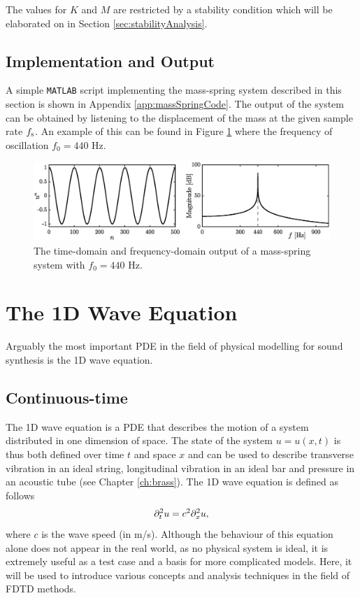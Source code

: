 The values for $K$ and $M$ are restricted by a stability condition which will be elaborated on in Section \ref{sec:stabilityAnalysis}.

\subsection{Implementation and Output}
A simple \texttt{MATLAB} script implementing the mass-spring system described in this section is shown in Appendix \ref{app:massSpringCode}. The output of the system can be obtained by listening to the displacement of the mass at the given sample rate $f_\text{s}$. An example of this can be found in Figure \ref{fig:massSpringOutput} where the frequency of oscillation $f_0 = 440$ Hz.

\begin{figure}[ht]
    \includegraphics[width=\textwidth]{figures/fdtd/massSpringOutput.eps}
    \caption{The time-domain and frequency-domain output of a mass-spring system with $f_0 = 440$ Hz. \label{fig:massSpringOutput}}
\end{figure}



\section{%
The 1D Wave Equation}
Arguably the most important PDE in the field of physical modelling for sound synthesis is the 1D wave equation.

\subsection{Continuous-time}
The 1D wave equation is a PDE that describes the motion of a system distributed in one dimension of space. The state of the system $u=u(x,t)$ is thus both defined over time $t$ and space $x$ and can be used to describe transverse vibration in an ideal string, longitudinal vibration in an ideal bar and pressure in an acoustic tube (see Chapter \ref{ch:brass}). The 1D wave equation is defined as follows
\begin{equation}\label{eq:1DwavePDE}
    \partial_t^2 u = c^2 \partial_x^2 u,
\end{equation}
where $c$ is the wave speed (in m/s). Although the behaviour of this equation alone does not appear in the real world, as no physical system is ideal, it is extremely useful as a test case and a basis for more complicated models. Here, it will be used to introduce various concepts and analysis techniques in the field of FDTD methods.

